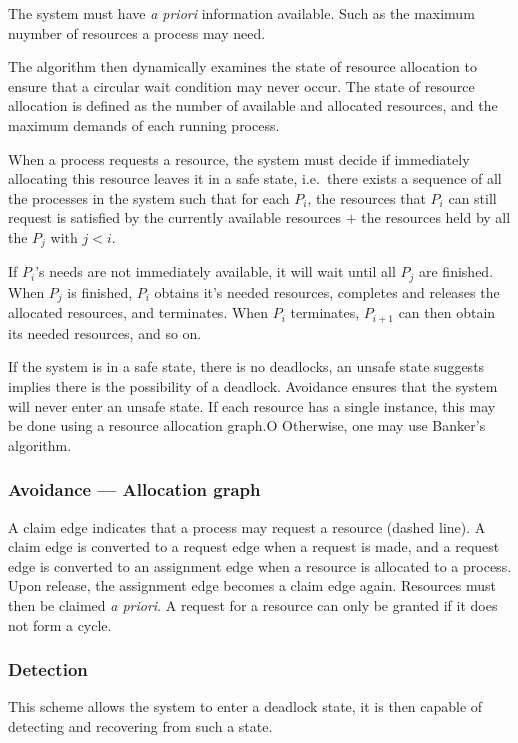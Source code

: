 The system must have \textit{a priori} information available. Such as the maximum nuymber of resources a process may need.

The algorithm then dynamically examines the state of resource allocation to ensure that a circular wait condition may never occur.
The state of resource allocation is defined as the number of available and allocated resources, and the maximum demands of each running process.

When a process requests a resource, the system must decide if immediately allocating this resource leaves it in a safe state,
i.e.\ there exists a sequence of all the processes in the system such that for each $P_i$, the resources
that $P_i$ can still request is satisfied by the currently available resources $+$ the resources held by all the $P_j$ with $j<i$.

If $P_i$'s needs are not immediately available, it will wait until all $P_j$ are finished. When $P_j$ is finished,
$P_i$ obtains it's needed resources, completes and releases the allocated resources, and terminates.
When $P_i$ terminates, $P_{i+1}$ can then obtain its needed resources, and so on.

If the system is in a safe state, there is no deadlocks, an unsafe state suggests implies there is the possibility of a deadlock. Avoidance
ensures that the system will never enter an unsafe state. If each resource has a single instance, this may be done using a resource allocation graph.O
Otherwise, one may use Banker's algorithm.

\subsubsection{Avoidance --- Allocation graph}

A claim edge indicates that a process may request a resource (dashed line). A claim edge is converted to a request edge when a request is made, and a request edge is converted to an
assignment edge when a resource is allocated to a process. Upon release, the assignment edge becomes a claim edge again. Resources must then be claimed \textit{a priori}.
A request for a resource can only be granted if it does not form a cycle.


\subsubsection{Detection}

This scheme allows the system to enter a deadlock state, it is then capable of detecting and recovering from such a state.

